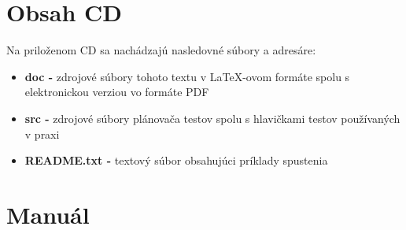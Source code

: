 \chapter{Obsah CD}
Na priloženom CD sa nachádzajú nasledovné súbory a adresáre:
\begin{itemize}
\item \textbf{doc -} zdrojové súbory tohoto textu v \LaTeX-ovom formáte spolu s elektronickou verziou vo formáte PDF
\item \textbf{src -} zdrojové súbory plánovača testov spolu s hlavičkami testov používaných v praxi
\item \textbf{README.txt -} textový súbor obsahujúci príklady spustenia
\end{itemize}

\chapter{Manuál}

